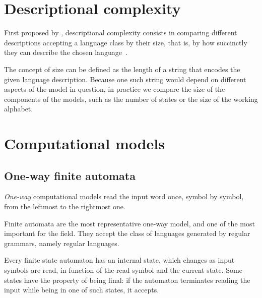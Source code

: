 \section{Descriptional complexity}
First proposed by \citeauthor{MeyFis71}, descriptional complexity consists in comparing different descriptions accepting a language class by their size, that is, by how succinctly they can describe the chosen language~\cite{MeyFis71}.

The concept of size can be defined as the length of a string that encodes the given language description.
Because one such string would depend on different aspects of the model in question, in practice we compare the size of the components of the models, such as the number of states or the size of the working alphabet.



\section{Computational models}


\subsection{One-way finite automata}
\emph{One-way} computational models read the input word once, symbol by symbol, from the leftmost to the rightmost one.

Finite automata are the most representative one-way model, and one of the most important for the field.
They accept the class of languages generated by regular grammars, namely regular languages.

Every finite state automaton has an internal state, which changes as input symbols are read, in function of the read symbol and the current state.
Some states have the property of being final: if the automaton terminates reading the input while being in one of such states, it accepts.

